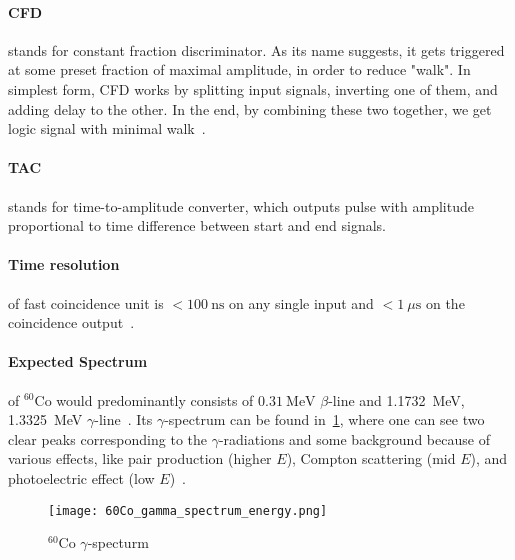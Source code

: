 
\paragraph{CFD} stands for constant fraction discriminator. As its name suggests, it gets triggered at some preset fraction of maximal amplitude, in order to reduce "walk". In simplest form, CFD works by splitting input signals, inverting one of them, and adding delay to the other. In the end, by combining these two together, we get logic signal with minimal walk~\cite{CFDmanual}.


\paragraph{TAC} stands for time-to-amplitude converter, which outputs pulse with amplitude proportional to time difference between start and end signals.

\paragraph{Time resolution} of fast coincidence unit is $< \SI{100}{\nano\s}$ on any single input and $< \SI{1}{\mu\s}$ on the coincidence output~\cite{fastmanual}.

\paragraph{Expected Spectrum} of ${}^{60} \text{Co}$ would predominantly consists of $\SI{0.31}{\mega\eV}$ $\beta$-line and \SI{1.1732}{\mega\eV}, \SI{1.3325}{\mega\eV} $\gamma$-line~\cite{firestone}. Its $\gamma$-spectrum can be found in~\ref{fig:CoSpec}, where one can see two clear peaks corresponding to the $\gamma$-radiations and some background because of various effects, like pair production (higher $E$), Compton scattering (mid $E$), and photoelectric effect (low $E$)~\cite{wermes}.

\begin{figure}[ht]
   \centering
   \texttt{[image: 60Co\_gamma\_spectrum\_energy.png]}
   \caption{${}^{60}\text{Co}$ $\gamma$-specturm~\cite{CoSpec}}%
   \label{fig:CoSpec}
\end{figure}
